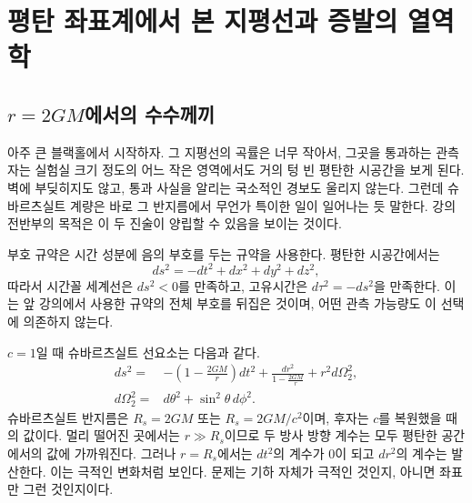 \chapter{평탄 좌표계에서 본 지평선과 증발의 열역학}


\section{\texorpdfstring{\(r=2GM\)}{r=2GM}에서의 수수께끼}

아주 큰 블랙홀에서 시작하자. 그 지평선의 곡률은 너무 작아서, 그곳을 통과하는 관측자는 실험실 크기 정도의 어느 작은 영역에서도 거의 텅 빈 평탄한 시공간을 보게 된다. 벽에 부딪히지도 않고, 통과 사실을 알리는 국소적인 경보도 울리지 않는다. 그런데 슈바르츠실트 계량은 바로 그 반지름에서 무언가 특이한 일이 일어나는 듯 말한다. 강의 전반부의 목적은 이 두 진술이 양립할 수 있음을 보이는 것이다.

부호 규약은 시간 성분에 음의 부호를 두는 규약을 사용한다. 평탄한 시공간에서는
\begin{equation}
ds^2=-dt^2+dx^2+dy^2+dz^2,
\end{equation}
따라서 시간꼴 세계선은 \(ds^2<0\)를 만족하고, 고유시간은 \(d\tau^2=-ds^2\)을 만족한다. 이는 앞 강의에서 사용한 규약의 전체 부호를 뒤집은 것이며, 어떤 관측 가능량도 이 선택에 의존하지 않는다.

\(c=1\)일 때 슈바르츠실트 선요소는 다음과 같다.
\begin{equation}
\begin{aligned}
ds^2={}&-\left(1-\frac{2GM}{r}\right)dt^2
+\frac{dr^2}{1-\frac{2GM}{r}}
+r^2d\Omega_2^2,\\
d\Omega_2^2={}&d\theta^2+\sin^2\theta\,d\phi^2 .
\end{aligned}
\label{eq:l03-schwarzschild}
\end{equation}
슈바르츠실트 반지름은 \(R_s=2GM\) 또는 \(R_s=2GM/c^2\)이며, 후자는 \(c\)를 복원했을 때의 값이다. 멀리 떨어진 곳에서는 \(r\gg R_s\)이므로 두 방사 방향 계수는 모두 평탄한 공간에서의 값에 가까워진다. 그러나 \(r=R_s\)에서는 \(dt^2\)의 계수가 0이 되고 \(dr^2\)의 계수는 발산한다. 이는 극적인 변화처럼 보인다. 문제는 기하 자체가 극적인 것인지, 아니면 좌표만 그런 것인지이다.

